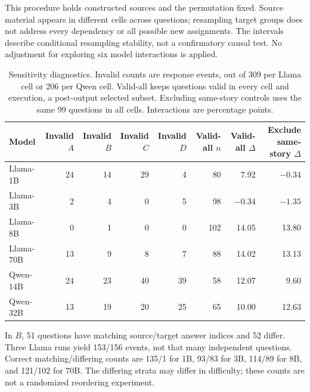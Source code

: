 This procedure holds constructed sources and the permutation fixed. Source material appears in different cells across questions; resampling target groups does not address every dependency or all possible new assignments. The intervals describe conditional resampling stability, not a confirmatory causal test. No adjustment for exploring six model interactions is applied.

\begin{table}[t]
\centering\small
\begin{tabular}{@{}lrrrrrrr@{}}
\toprule
Model & Invalid $A$ & Invalid $B$ & Invalid $C$ & Invalid $D$ & Valid-all $n$ & Valid-all $\Delta$ & Exclude same-story $\Delta$ \\
\midrule
Llama-1B & 24 & 14 & 29 & 4 & 80 & 7.92 & $-0.34$ \\
Llama-3B & 2 & 4 & 0 & 5 & 98 & $-0.34$ & $-1.35$ \\
Llama-8B & 0 & 1 & 0 & 0 & 102 & 14.05 & 13.80 \\
Llama-70B & 13 & 9 & 8 & 7 & 88 & 14.02 & 13.13 \\
Qwen-14B & 24 & 23 & 40 & 39 & 58 & 12.07 & 9.60 \\
Qwen-32B & 13 & 19 & 20 & 25 & 65 & 10.00 & 12.63 \\
\bottomrule
\end{tabular}
\caption{Sensitivity diagnostics. Invalid counts are response events, out of 309 per Llama cell or 206 per Qwen cell. Valid-all keeps questions valid in every cell and execution, a post-output selected subset. Excluding same-story controls uses the same 99 questions in all cells. Interactions are percentage points.}
\label{tab:sensitivity}
\end{table}

In $B$, 51 questions have matching source/target answer indices and 52 differ. Three Llama runs yield 153/156 events, not that many independent questions. Correct matching/differing counts are 135/1 for 1B, 93/83 for 3B, 114/89 for 8B, and 121/102 for 70B. The differing strata may differ in difficulty; these counts are not a randomized reordering experiment.

